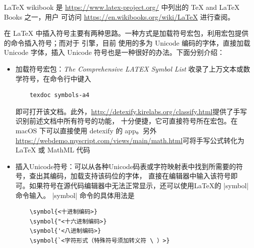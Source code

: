 








\LaTeX{} wikibook 是 \url{https://www.latex-project.org/} 中列出的 \TeX{} and \LaTeX{} Books 之一，用户
可访问 \url{https://en.wikibooks.org/wiki/LaTeX} 进行查阅。


%
%
在 \LaTeX{} 中插入符号主要有两种思路。一种方式是加载符号宏包，利用宏包提供的命令插入符号；而对于 \XeTeX{} 引擎，目前
使用的多为 Unicode 编码的字体，直接加载 Unicode 字体，插入 Unicode 符号也是一种很好的办法。下面分别介绍：
\begin{itemize}
  \item 加载符号宏包：\emph{The Comprehensive LATEX Symbol List} 收录了上万文本或数学符号，在命令行中键入
  \begin{verbatim}
    texdoc symbols-a4
  \end{verbatim}
  即可打开该文档。此外，\url{http://detexify.kirelabs.org/classify.html}提供了手写识别前述文档中所有符号的功能，
  十分便捷，它可直接符号所在宏包。在 macOS 下可以直接使用 detexify 的 app。另外
  \url{https://webdemo.myscript.com/views/main/math.html}可将手写公式转化为 \LaTeX{} 或 MathML 代码
  \item 插入Unicode符号：可以从各种Unicode码表或字符映射表中找到所需要的符号，查出其编码，加载支持该码位的字体，
  直接在编辑器中输入该符号即可。如果符号在源代码编辑器中无法正常显示，还可以使用\LaTeX{}的 |symbol| 命令输入。
  |symbol| 命令的具体用法是
  \begin{verbatim}
    \symbol{<十进制编码>}
    \symbol{"<十六进制编码>}
    \symbol{'<八进制编码>}
    \symbol{`<字符形式（特殊符号须加转义符 \ ）>}
  \end{verbatim}
\end{itemize}

